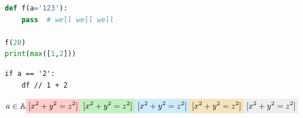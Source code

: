 \documentclass[11pt,twoside]{tenth}
\begin{document}
\lipsum[1]
\begin{lstlisting}[language=Python]
def f(a='123'):
    pass  # well well well

f(20)
print(max([1,2]))
\end{lstlisting}

\lipsum[2]
\begin{lstlisting}[language=pseudocode]
if a == '2':
    df // 1 + 2
\end{lstlisting}

\[
    a \in \Algebraic
        \rhl{[{}x^2 + y^2 = z^2{}]}
        \ghl{[{}x^2 + y^2 = z^2{}]}
        \bhl{[{}x^2 + y^2 = z^2{}]}
        \yhl{[{}x^2 + y^2 = z^2{}]}
        \hl{[{}x^2 + y^2 = z^2{}]}
\]

\end{document}

